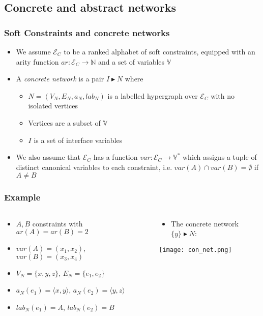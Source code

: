 \documentclass{beamer}
\begin{document}
\subsection{Concrete and abstract networks}
\begin{frame}
\frametitle{Soft Constraints and concrete networks}
\begin{itemize}
	\item We assume $\mathcal{E}_C$ to be a ranked alphabet of soft constraints, equipped with
	an arity function $ar: \mathcal{E}_C \rightarrow \mathbb{N}$ and a set of variables 
	$\mathbb{V}$
\medskip
	\item A \emph{concrete network} is a pair $I \blacktriangleright N$ where
	\begin{itemize}
		\item $N = (V_N, E_N, a_N, lab_N)$ is a labelled hypergraph over $\mathcal{E}_C$
		with no isolated vertices
		\item Vertices are a subset of $\mathbb{V}$
		\item $I$ is a set of interface variables
	\end{itemize}
\medskip
	\item We also assume that $\mathcal{E}_C$ has a function 
	$var: \mathcal{E}_C \rightarrow \mathbb{V}^*$ which assigns a tuple of distinct canonical
	variables to each constraint, i.e. $var(A) \cap var(B) = \emptyset$ if $A \neq B$
\end{itemize}
\end{frame}

\begin{frame}
\frametitle{Example}
\begin{columns}
\begin{column}{0.5\textwidth}
   \begin{itemize}
	\item $A, B$ constraints with $ar(A) = ar(B) = 2$
	\item $var(A) = (x_1, x_2)$, $var(B) = (x_3, x_4)$
	\item $V_N = \{x,y,z\}$, $E_N = \{e_1,e_2\}$
	\item $a_N(e_1) = \langle x, y \rangle$, $a_N(e_2) = \langle y, z \rangle$
	\item $lab_N(e_1) = A$, $lab_N(e_2) = B$	
\end{itemize}
\end{column}
\begin{column}{0.5\textwidth}
	\begin{itemize}
		\item The concrete network $\{y\} \blacktriangleright N$:
	\end{itemize}
    \begin{center}
     \texttt{[image: con\_net.png]}      
    \end{center}
\end{column}
\end{columns}
\end{frame}
\end{document}
